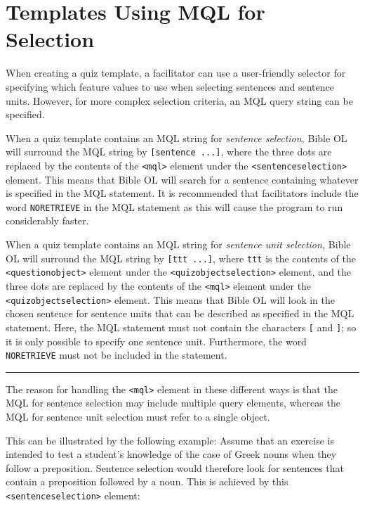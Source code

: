 \documentclass[11pt,oneside,a4paper]{memoir}
\newcommand*{\xml}[1]{\texttt{<#1>}}
\begin{document}
\section{Templates Using MQL for Selection}\label{sec-mql-selection}

When creating a quiz template, a facilitator can use a user-friendly selector for specifying which
feature values to use when selecting sentences and sentence units. However, for more complex
selection criteria, an MQL query string can be specified.

When a quiz template contains an MQL string for \emph{sentence selection,} Bible OL will surround
the MQL string by \texttt{[sentence ...]}, where the three dots are replaced by the contents of the
\xml{mql} element under the \xml{sentenceselection} element. This means that Bible OL will search for a
sentence containing whatever is specified in the MQL statement. It is recommended that facilitators
include the word \texttt{NORETRIEVE} in the MQL statement as this will cause the program to run
considerably faster.

When a quiz template contains an MQL string for \emph{sentence unit selection,} Bible OL will
surround the MQL string by \texttt{[ttt ...]}, where \texttt{ttt} is the contents of the
\xml{questionobject} element under the \xml{quizobjectselection} element, and the three dots are
replaced by the contents of the \xml{mql} element under the \xml{quizobjectselection} element.
This means that Bible OL will look in the chosen sentence for sentence units that can be described
as specified in the MQL statement. Here, the MQL statement must not contain the characters
\texttt{[} and \texttt{]}; so it is only possible to specify one sentence unit. Furthermore, the
word \texttt{NORETRIEVE} must not be included in the statement.

\pfbreak

The reason for handling the \xml{mql} element in these different ways is that the MQL for sentence
selection may include multiple query elements, whereas the MQL for sentence unit selection must
refer to a single object.

This can be illustrated by the following example: Assume that an exercise is intended to test a
student's knowledge of the case of Greek nouns when they follow a preposition. Sentence selection
would therefore look for sentences that contain a preposition followed by a noun. This is achieved
by this \xml{sentenceselection} element:
\end{document}
